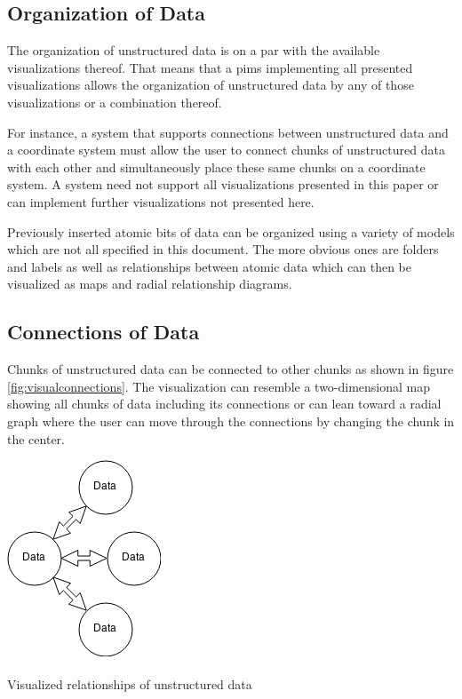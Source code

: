 \subsection{Organization of Data}

The organization of unstructured data is on a par with the available
visualizations thereof. That means that a \gls{pims} implementing all presented
visualizations allows the organization of unstructured data by any of those
visualizations or a combination thereof.

For instance, a system that supports connections between unstructured data and
a coordinate system must allow the user to connect chunks of unstructured data
with each other and simultaneously place these same chunks on a coordinate system.
A system need not support all visualizations presented in this paper or can
implement further visualizations not presented here.

Previously inserted atomic bits of data can be organized using a variety of models which are not all specified in this document. The more obvious ones are folders and labels as well as relationships between atomic data which can then be visualized as maps and radial relationship diagrams.

\subsection{Connections of Data}

Chunks of unstructured data can be connected to other chunks as shown in figure
\ref{fig:visualconnections}. The visualization can resemble a two-dimensional
map showing all chunks of data including its connections or can lean toward a
radial graph where the user can move through the connections by changing the
chunk in the center.

\begin{flfigure}
  \centering
    \includegraphics[width=0.5\linewidth]{00_resources/data_connections.png}
    \caption{Visualized relationships of unstructured data}
  \label{fig:visualconnections}
\end{flfigure}

